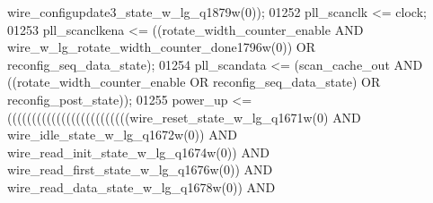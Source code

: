 \begin{DoxyCode}
{{      wire_configupdate3_state_w_lg_q1879w}\textcolor{vhdlchar}{(}\textcolor{vhdllogic}{}\textcolor{vhdllogic}{0}\textcolor{vhdlchar}{)}\textcolor{vhdlchar}{)};
01252     \textcolor{vhdlchar}{pll_scanclk} \textcolor{vhdlchar}{<=} \textcolor{vhdlchar}{clock};
01253     \textcolor{vhdlchar}{pll_scanclkena} \textcolor{vhdlchar}{<=} \textcolor{vhdlchar}{(}\textcolor{vhdlchar}{(}\textcolor{vhdlchar}{rotate_width_counter_enable} \textcolor{keywordflow}{AND} \textcolor{vhdlchar}{
      wire_w_lg_rotate_width_counter_done1796w}\textcolor{vhdlchar}{(}\textcolor{vhdllogic}{}\textcolor{vhdllogic}{0}\textcolor{vhdlchar}{)}\textcolor{vhdlchar}{)} \textcolor{keywordflow}{OR} \textcolor{vhdlchar}{reconfig_seq_data_state}\textcolor{vhdlchar}{)};
01254     \textcolor{vhdlchar}{pll_scandata} \textcolor{vhdlchar}{<=} \textcolor{vhdlchar}{(}\textcolor{vhdlchar}{scan_cache_out} \textcolor{keywordflow}{AND} \textcolor{vhdlchar}{(}\textcolor{vhdlchar}{(}\textcolor{vhdlchar}{rotate_width_counter_enable} \textcolor{keywordflow}{OR} \textcolor{vhdlchar}{
      reconfig_seq_data_state}\textcolor{vhdlchar}{)} \textcolor{keywordflow}{OR} \textcolor{vhdlchar}{reconfig_post_state}\textcolor{vhdlchar}{)}\textcolor{vhdlchar}{)};
01255     \textcolor{vhdlchar}{power_up} \textcolor{vhdlchar}{<=} \textcolor{vhdlchar}{(}\textcolor{vhdlchar}{(}\textcolor{vhdlchar}{(}\textcolor{vhdlchar}{(}\textcolor{vhdlchar}{(}\textcolor{vhdlchar}{(}\textcolor{vhdlchar}{(}\textcolor{vhdlchar}{(}\textcolor{vhdlchar}{(}\textcolor{vhdlchar}{(}\textcolor{vhdlchar}{(}\textcolor{vhdlchar}{(}\textcolor{vhdlchar}{(}\textcolor{vhdlchar}{(}\textcolor{vhdlchar}{(}\textcolor{vhdlchar}{(}\textcolor{vhdlchar}{(}\textcolor{vhdlchar}{(}\textcolor{vhdlchar}{(}\textcolor{vhdlchar}{(}\textcolor{vhdlchar}{(}\textcolor{vhdlchar}{(}\textcolor{vhdlchar}{(}\textcolor{vhdlchar}{(}\textcolor{vhdlchar}{(}\textcolor{vhdlchar}{wire_reset_state_w_lg_q1671w}\textcolor{vhdlchar}{(}\textcolor{vhdllogic}{}\textcolor{vhdllogic}{0}\textcolor{vhdlchar}{)} \textcolor{keywordflow}{AND} \textcolor{vhdlchar}{
      wire_idle_state_w_lg_q1672w}\textcolor{vhdlchar}{(}\textcolor{vhdllogic}{}\textcolor{vhdllogic}{0}\textcolor{vhdlchar}{)}\textcolor{vhdlchar}{)} \textcolor{keywordflow}{AND} \textcolor{vhdlchar}{wire_read_init_state_w_lg_q1674w}\textcolor{vhdlchar}{(}\textcolor{vhdllogic}{}\textcolor{vhdllogic}{0}\textcolor{vhdlchar}{)}\textcolor{vhdlchar}{)} \textcolor{keywordflow}{AND} \textcolor{vhdlchar}{
      wire_read_first_state_w_lg_q1676w}\textcolor{vhdlchar}{(}\textcolor{vhdllogic}{}\textcolor{vhdllogic}{0}\textcolor{vhdlchar}{)}\textcolor{vhdlchar}{)} \textcolor{keywordflow}{AND} \textcolor{vhdlchar}{wire_read_data_state_w_lg_q1678w}\textcolor{vhdlchar}{(}\textcolor{vhdllogic}{}\textcolor{vhdllogic}{0}\textcolor{vhdlchar}{)}\textcolor{vhdlchar}{)} \textcolor{keywordflow}{AND} \textcolor{vhdlchar}{
}}
\end{DoxyCode}
